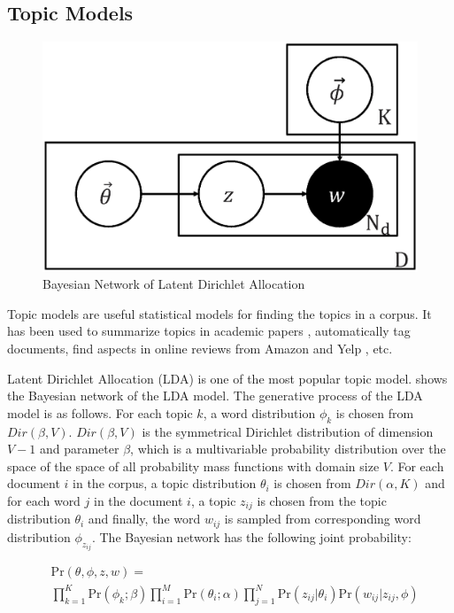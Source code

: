 \subsection{Topic Models}

\begin{figure}[!h] 
	\centering 
	\includegraphics[scale=0.3]{figs/lda.eps}
	\caption{Bayesian Network of Latent Dirichlet Allocation} 
	\label{fig:lda_pgm}
\end{figure}

Topic models are useful statistical models for finding the topics in a corpus.
It has been used to summarize topics in academic papers
\cite{griffiths2004finding}, automatically tag documents, find aspects in
online reviews from Amazon and Yelp \cite{Jo2011}, etc.

Latent Dirichlet Allocation (LDA) is one of the most popular topic model.
 shows the Bayesian network of the LDA model. The
generative process of the LDA model is as follows. For each topic $k$, a word
distribution $\phi_k$ is chosen from $Dir(\beta, V)$.  $Dir(\beta, V)$ is the
symmetrical Dirichlet distribution of dimension $V - 1$ and parameter $\beta$,
which is a multivariable probability distribution over the space of the space
of all probability mass functions with domain size $V$.  For each document $i$
in the corpus, a topic distribution $\theta_i$ is chosen from $Dir(\alpha, K)$
and for each word $j$ in the document $i$, a topic $z_{ij}$ is chosen from the
topic distribution $\theta_i$ and finally, the word $w_{ij}$ is sampled from
corresponding word distribution $\phi_{z_{ij}}$.  The Bayesian network has the
following joint probability:

{\footnotesize 
\begin{align*} 
	&\mathrm{Pr}(\theta, \phi, z, w) = \\ 
	&\prod_{k=1}^{K}
	\mathrm{Pr}(\phi_k;\beta) \prod_{i=1}^{M} 
	\mathrm{Pr} (\theta_i;\alpha) \prod_{j=1}^{N}
	\mathrm{Pr}(z_{ij}|\theta_i) \mathrm{Pr}(w_{ij}|z_{ij}, \phi) 
\end{align*} 
}

